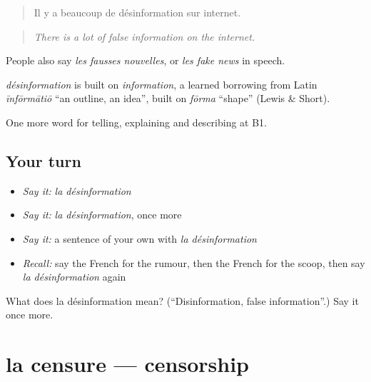 \begin{quote}
Il y a beaucoup de désinformation sur internet.
\end{quote}

\begin{quote}
\emph{There is a lot of false information on the internet.}
\end{quote}

People also say \emph{les fausses nouvelles}, or \emph{les fake news} in speech.

\begin{cousinweb}
\emph{désinformation} is built on \emph{information}, a learned borrowing from Latin \emph{īnfōrmātiō} \textquotedblleft{}an outline, an idea\textquotedblright{}, built on \emph{fōrma} \textquotedblleft{}shape\textquotedblright{} (Lewis \& Short).
\end{cousinweb}

\begin{grammarlens}[title={What you've built}]
One more word for telling, explaining and describing at B1.
\end{grammarlens}

\subsection*{Your turn}
\begin{itemize}
\raggedright
  \item \emph{Say it:} \emph{la désinformation}
  \item \emph{Say it:} \emph{la désinformation}, once more
  \item \emph{Say it:} a sentence of your own with \emph{la désinformation}
  \item \emph{Recall:} say the French for the rumour, then the French for the scoop, then say \emph{la désinformation} again
\end{itemize}

\begin{tcolorbox}[breakable,colback=teal!4,colframe=teal!35!black,title={Before you move on}]
What does la désinformation mean? (\textquotedblleft{}Disinformation, false information\textquotedblright{}.) Say it once more.
\end{tcolorbox}
\section[la censure]{la censure — censorship}

\label{lesson:FR-C285-censure}



